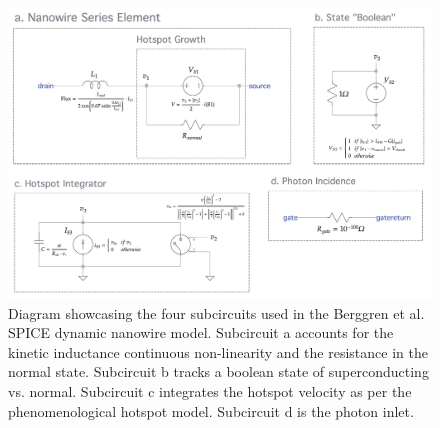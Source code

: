 \begin{figure}
    \centering
    \includegraphics[width=\textwidth]{figs/old_nw.png}
    \caption{Diagram showcasing the four subcircuits used in the 
    Berggren et al. SPICE dynamic nanowire model. 
    Subcircuit a accounts for the kinetic inductance
    continuous non-linearity and the resistance in the normal state. Subcircuit b
    tracks a boolean state of superconducting vs. normal. Subcircuit c integrates
    the hotspot velocity as per the phenomenological hotspot model. Subcircuit
    d is the photon inlet.
    }
    \label{fig:old_nw}
\end{figure}

